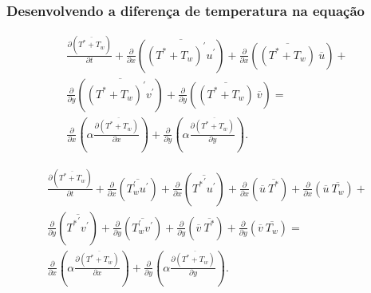 \documentclass[xcolor=dvipsnames,10pt,aspectratio=169]{beamer}
\begin{document}
		
		\begin{frame}
		\frametitle{Desenvolvendo a diferença de temperatura na equação}
		\begin{equation}
		\begin{split}
		\frac{\partial ( \overline{T^\ast + T_w}  ) }{\partial t} +
		\frac{\partial{}}{\partial{x}} \left(\overline{(T^\ast + T_w)^\prime u^\prime}\right) + \frac{\partial{}}{\partial{x}}\left(\overline{(T^\ast + T_w)} \ \overline{u}\right)+  \\
		\frac{\partial{}}{\partial{y}} \left(\overline{(T^\ast + T_w)^\prime v^\prime}\right) + \frac{\partial{}}{\partial{y}}\left(\overline{(T^\ast + T_w)} \ \overline{v}\right) = \\
		{\frac{\partial{}}{\partial{x}}} \left(\alpha {\frac{\partial{\overline{(T^\ast + T_w)}}}{\partial{x}}} \right) +
		{\frac{\partial{}}{\partial{y}}} \left(\alpha {\frac{\partial{\overline{(T^\ast + T_w)}}}{\partial{y}}} \right) .
		\end{split}
		\end{equation}
		\begin{center}\begin{equation}\begin{split}
		\frac{\partial ( \overline{ T^\ast + T_w } ) }{\partial t} +
		\frac{\partial{}}{\partial{x}} \left(\overline{T_w^{\prime} u^{\prime}}\right) +\frac{\partial{}}{\partial{x}} \left(\overline{{T^{\ast}}^{\prime} u^{\prime}}\right)
		+\frac{\partial{}}{\partial{x}}\left(\overline{u} \ \overline{T^{\ast}}\right)+ 
		\frac{\partial{}}{\partial{x}}\left(\overline{u} \ \overline{T_w}\right)+ 
		\\
		\frac{\partial{}}{\partial{y}} \left(\overline{{T^{\ast}}^{\prime} v^{\prime}}\right)+
		\frac{\partial{}}{\partial{y}} \left(\overline{T_w^\prime v^\prime}\right) + \frac{\partial{}}{\partial{y}}\left(\overline{v} \ \overline{T^\ast}\right) +
		\frac{\partial{}}{\partial{y}}\left(\overline{v} \ \overline{T_w}\right) 
		= 
		\\
		{\frac{\partial{}}{\partial{x}}} \left(\alpha {\frac{\partial{\overline{(T^\ast + T_w)}}}{\partial{x}}} \right) +
		{\frac{\partial{}}{\partial{y}}} \left(\alpha {\frac{\partial{\overline{(T^\ast + T_w)}}}{\partial{y}}} \right) .
		\end{split}\end{equation}\end{center}
		\end{frame}
		
		
		
		
		
\end{document}
